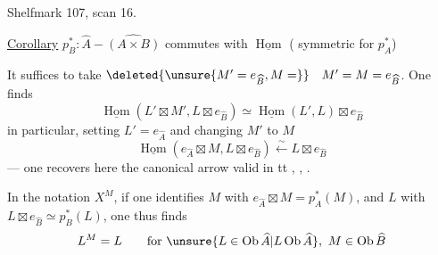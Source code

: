Shelfmark 107, scan 16.

\uline{Corollary} $p_B^*: \widehat A\mathbin{-}\widehat{(A\times B)}$ commutes with $\underline{\operatorname{Hom}}$
( symmetric for $p_A^*$)

It suffices to take $\deleted{\unsure{M'=e_{\widehat B},M=}}\quad M'=M=e_{\widehat B}$. One finds
\[
\underline{\operatorname{Hom}}(L'\boxtimes M',L\boxtimes e_{\widehat B})\simeq\underline{\operatorname{Hom}}(L',L)\boxtimes e_{\widehat B}
\]
in particular, setting $L'=e_{\widehat A}$ and changing $M'$ to $M$
\[
\underline{\operatorname{Hom}}(e_{\widehat A}\boxtimes M,L\boxtimes e_{\widehat B})\xleftarrow{\sim}L\boxtimes e_{\widehat B}
\]
--- one recovers here the   canonical arrow
valid in tt , , .

In the notation $X^M$, if one identifies $M$ with $e_{\widehat A}\boxtimes M=p_A^*(M)$, and  $L$ with $L\boxtimes e_{\widehat B}\simeq p_B^*(L)$, one thus finds
\[
L^M=L\qquad\text{for }\unsure{L\in\operatorname{Ob}\widehat A|L\operatorname{Ob}\widehat A},\ M\in\operatorname{Ob}\widehat B
\]
